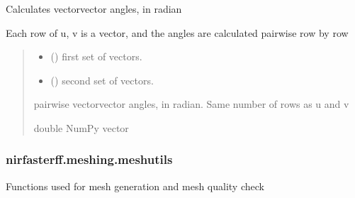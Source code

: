 \documentclass[letterpaper,10pt,english]{sphinxmanual}
\begin{document}
\begin{fulllineitems}
\label{\detokenize{_autosummary/nirfasterff.meshing.auxiliary.vector_vector_angle:nirfasterff.meshing.auxiliary.vector_vector_angle}}
\pysigstartsignatures
{}
\pysigstopsignatures
\sphinxAtStartPar
Calculates vector\sphinxhyphen{}vector angles, in radian

\sphinxAtStartPar
Each row of u, v is a vector, and the angles are calculated pairwise row by row
\begin{quote}\begin{description}
\begin{itemize}
\item {} 
\sphinxAtStartPar
{} () \textendash{} first set of vectors.

\item {} 
\sphinxAtStartPar
{} () \textendash{} second set of vectors.

\end{itemize}

\sphinxAtStartPar
pairwise vector\sphinxhyphen{}vector angles, in radian. Same number of rows as u and v

\sphinxAtStartPar
double NumPy vector

\end{description}\end{quote}

\end{fulllineitems}


\sphinxstepscope


\subsubsection{nirfasterff.meshing.meshutils}
\label{\detokenize{_autosummary/nirfasterff.meshing.meshutils:module-nirfasterff.meshing.meshutils}}\label{\detokenize{_autosummary/nirfasterff.meshing.meshutils:nirfasterff-meshing-meshutils}}\label{\detokenize{_autosummary/nirfasterff.meshing.meshutils::doc}}
\sphinxAtStartPar
Functions used for mesh generation and mesh quality check
\end{document}
